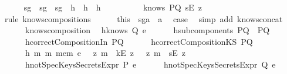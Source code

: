 \begin{isabellebody}
\ \ \ \ \isamarkupfalse%
\ sg{}\ \ sg{}\ \ sg{}{}\ \ h{}\ \ h{}\ \ h{}\ \ \isanewline
\ \ \ \ \ \ \isamarkupfalse%
\ {\isachardoublequoteopen}knows\ PQ\ {\isacharbrackleft}sE\ z{\isacharbrackright}{\isachardoublequoteclose}\ \isanewline
\ \ \ \ \ \ \isamarkupfalse%
\ {\isacharparenleft}rule\ knows{\isacharunderscore}composition{}{\isacharunderscore}s{\isacharparenright}\isanewline
\ \ \ \ \isamarkupfalse%
\ this\ \ sg{}a\ \ a{}\ \isamarkupfalse%
\ {\isacharquery}case\ \isamarkupfalse%
\ {\isacharparenleft}simp\ add{\isacharcolon}\ knows{\isacharunderscore}concat{\isacharunderscore}{}{\isacharparenright}\isanewline
\ \ \isamarkupfalse%
\ \isanewline
{}\isamarkupfalse%
%
\endisatagproof
{\isafoldproof}%
%
\isadelimproof
\ \isanewline
%
\endisadelimproof
\ \isanewline
{}\isamarkupfalse%
\ knows{\isacharunderscore}composition{}{\isacharcolon}\isanewline
\ \ h{}{\isacharcolon}{\isachardoublequoteopen}knows\ Q\ e{\isachardoublequoteclose}\isanewline
\ \ \ \ \ \ h{}{\isacharcolon}{\isachardoublequoteopen}subcomponents\ PQ\ {\isacharequal}\ {\isacharbraceleft}P{\isacharcomma}Q{\isacharbraceright}{\isachardoublequoteclose}\ \isanewline
\ \ \ \ \ \ h{}{\isacharcolon}{\isachardoublequoteopen}correctCompositionIn\ PQ{\isachardoublequoteclose}\isanewline
\ \ \ \ \ \ h{}{\isacharcolon}{\isachardoublequoteopen}correctCompositionKS\ PQ{\isachardoublequoteclose}\isanewline
\ \ \ \ \ \ h{}{\isacharcolon}{\isachardoublequoteopen}{\isasymforall}\ m{\isachardot}\ m\ mem\ e\ {\isasymlongrightarrow}\ {\isacharparenleft}{\isacharparenleft}{\isasymexists}\ z{\isachardot}\ m\ {\isacharequal}\ kE\ z{\isacharparenright}\ {\isasymor}\ {\isacharparenleft}{\isasymexists}\ z{\isachardot}\ m\ {\isacharequal}\ sE\ z{\isacharparenright}{\isacharparenright}{\isachardoublequoteclose}\isanewline
\ \ \ \ \ \ h{}{\isacharcolon}{\isachardoublequoteopen}notSpecKeysSecretsExpr\ P\ e{\isachardoublequoteclose}\isanewline
\ \ \ \ \ \ h{}{\isacharcolon}{\isachardoublequoteopen}notSpecKeysSecretsExpr\ Q\ e{\isachardoublequoteclose}\ \isanewline

\end{isabellebody}
